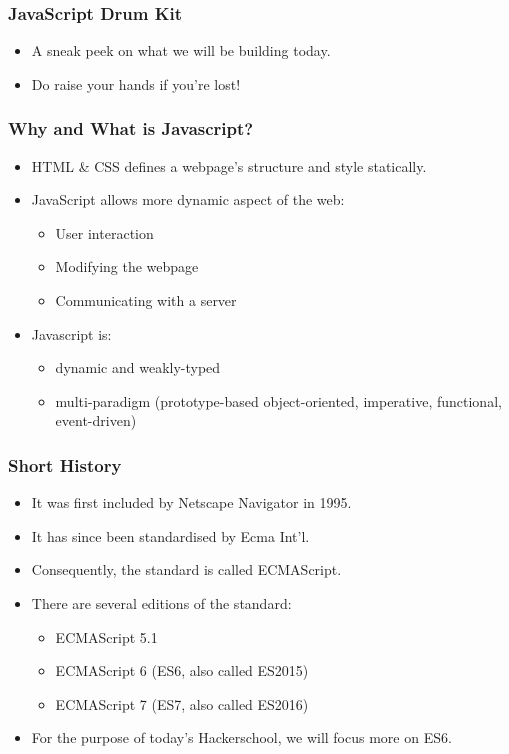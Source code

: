 \documentclass[handout,12pt]{beamer}
\begin{document}
	\begin{frame}
		\frametitle{JavaScript Drum Kit}
		\begin{itemize}
			\item A sneak peek on what we will be building today.
			\item Do raise your hands if you're lost!
		\end{itemize}
	\end{frame}

	\begin{frame}
		\frametitle{Why and What is Javascript?}
		\begin{itemize}
			\item HTML \& CSS defines a webpage's structure and style statically.
			\item JavaScript allows more dynamic aspect of the web:
			\begin{itemize}
				\item User interaction
				\item Modifying the webpage
				\item Communicating with a server
			\end{itemize}
			\item Javascript is:
			\begin{itemize}
				\item dynamic and weakly-typed
				\item multi-paradigm (prototype-based object-oriented, imperative, functional, event-driven)
			\end{itemize}
		\end{itemize}
	\end{frame}
	
	\begin{frame}
		\frametitle{Short History}
		\begin{itemize}
			\item It was first included by Netscape Navigator in 1995.
			\item It has since been standardised by Ecma Int'l.
			\item Consequently, the standard is called ECMAScript.
			\item There are several editions of the standard:
			\begin{itemize}
				\item ECMAScript 5.1
				\item ECMAScript 6 (ES6, also called ES2015)
				\item ECMAScript 7 (ES7, also called ES2016)
			\end{itemize}
			\item For the purpose of today's Hackerschool, we will focus more on ES6.
		\end{itemize}
	\end{frame}
	
\end{document}

